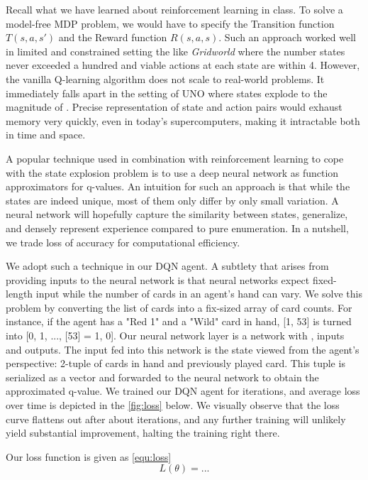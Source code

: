 \documentclass{article}
\begin{document}
Recall what we have learned about reinforcement learning in class. To solve a model-free MDP problem, we would have to specify the Transition function $T(s, a, s')$ and the Reward function $R(s, a, s)$. Such an approach worked well in limited and constrained setting the like \textit{Gridworld} where the number states never exceeded a hundred and viable actions at each state are within 4. However, the vanilla Q-learning algorithm does not scale to real-world problems. It immediately falls apart in the setting of UNO where states explode to the magnitude of . Precise representation of state and action pairs would exhaust memory very quickly, even in today's supercomputers, making it intractable both in time and space. 

A popular technique used in combination with reinforcement learning to cope with the state explosion problem is to use a deep neural network as function approximators for q-values. An intuition for such an approach is that while the \todo{} states are indeed unique, most of them only differ by only small variation. A neural network will hopefully capture the similarity between states, generalize, and densely represent experience compared to pure enumeration. In a nutshell, we trade loss of accuracy for computational efficiency.

We adopt such a technique in our DQN agent. A subtlety that arises from providing inputs to the neural network is that neural networks expect fixed-length input while the number of cards in an agent's hand can vary. We solve this problem by converting the list of cards into a fix-sized array of card counts. For instance, if the agent has a "Red 1" and a "Wild" card in hand, [1, 53] is turned into [0, 1, ..., [53] = 1, 0]. Our neural network layer is a  network with , \todo{} inputs and \todo{} outputs. The input fed into this network is the state viewed from the agent's perspective: 2-tuple of cards in hand and previously played card. This tuple is serialized as a vector and forwarded to the neural network to obtain the approximated q-value. We trained our DQN agent for \todo{} iterations, and average loss over time is depicted in the \ref{fig:loss} below. We visually observe that the loss curve flattens out after about \todo{} iterations, and any further training will unlikely yield substantial improvement, halting the training right there.

Our loss function is given as \ref{equ:loss}
\begin{equation}
    L(\theta) = ...
    \label{equ:loss}
\end{equation}
\end{document}
